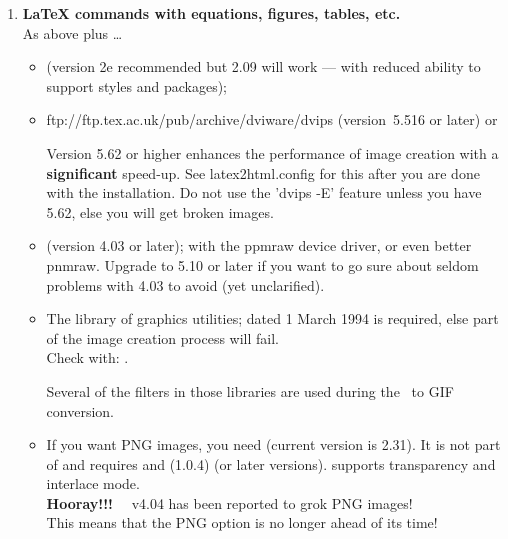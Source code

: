 \begin{enumerate}
%
%
%
\item 
\textbf{\LaTeX{}  commands with equations, figures, tables, etc.} \\
As above plus \dots
%
\begin{itemize}
\item {} (version 2e recommended but 2.09 will work --- with
reduced ability to support styles and packages);
%
\item 
{}
{ftp://ftp.tex.ac.uk/pub/archive/dviware/dvips}
(version~5.516 or later) or \\
\begin{changebar}
  Version 5.62 or higher enhances the performance of image creation
  with a {\bf significant} speed-up. See latex2html.config for this
  after you are done with the installation.
  Do not use the 'dvips -E' feature unless you have 5.62, else you
  will get broken images.
\end{changebar}
%
\item 
{}\begin{changebar}
  (version 4.03 or later);
  with the ppmraw device driver, or even better pnmraw.
  Upgrade to 5.10 or later if you want to go sure about seldom problems
  with 4.03 to avoid (yet unclarified).
\end{changebar}
%
%
%
\item 
{}\begin{changebar}
The 
library of graphics utilities;  dated 1 March 1994
is required, else part of the image creation process will fail.\\
Check with:  .
\end{changebar}

Several of the filters in those libraries are used during the \PS\ to
GIF conversion. 
%
%
\item 
{}\begin{changebar}
If you want PNG images, you need  (current version is 2.31).
It is not part of  and requires  and
 (1.0.4) (or later versions).
 supports transparency and interlace mode.\\
{\bf Hooray!!!}~~ 
 v4.04 has been reported to grok PNG images!\\
This means that the PNG option is no longer ahead of its time!
\end{changebar}
\end{itemize}



\end{enumerate}
